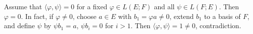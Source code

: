 Assume that $\langle \varphi, \psi \rangle = 0$ for a fixed $\varphi \in L(E;F)$ and all $\psi \in L(F;E)$. Then $\varphi = 0$.
In fact, if $\varphi \neq 0$, choose $a \in E$ with $b_1 = \varphi a \neq 0$, extend $b_1$ to a basis of $F$, and define $\psi$ by $\psi b_1 = a$, $\psi b_i = 0$ for $i > 1$. Then $\langle \varphi, \psi \rangle = 1 \neq 0$, contradiction.
